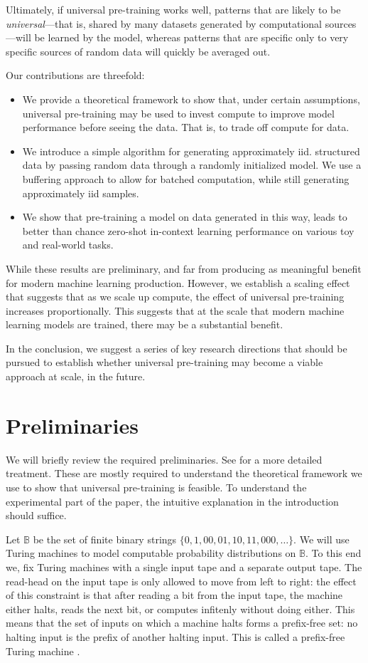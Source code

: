 \documentclass{article} %
\newcommand{\B}{\mathbb B}
\begin{document}
Ultimately, if universal pre-training works well, patterns that are likely to be \emph{universal}---that is, shared by many datasets generated by computational sources---will be learned by the model, whereas patterns that are specific only to very specific sources of random data will quickly be averaged out. 

Our contributions are threefold:
\begin{itemize}
\item We provide a theoretical framework to show that, under certain assumptions, universal pre-training may be used to invest compute to improve model performance before seeing the data. That is, to trade off compute for data. 
\item We introduce a simple algorithm for generating approximately iid. structured data by passing random data through a randomly initialized model. We use a buffering approach to allow for batched computation, while still generating approximately iid samples.
\item We show that pre-training a model on data generated in this way, leads to better than chance zero-shot in-context learning performance on various toy and real-world tasks. 
\end{itemize}

While these results are preliminary, and far from producing as meaningful benefit for modern machine learning production. However, we establish a scaling effect that suggests that as we scale up compute, the effect of universal pre-training increases proportionally. This suggests that at the scale that modern machine learning models are trained, there may be a substantial benefit.

In the conclusion, we suggest a series of key research directions that should be pursued to establish whether universal pre-training may become a viable approach at scale, in the future.

\section{Preliminaries}

We will briefly review the required preliminaries. See \cite{} for a more detailed treatment. These are mostly required to understand the theoretical framework we use to show that universal pre-training is feasible. To understand the experimental part of the paper, the intuitive explanation in the introduction should suffice.

Let $\B$ be the set of finite binary strings $\{0, 1, 00, 01, 10, 11, 000, \ldots\}$. We will use Turing machines \cite{} to model computable probability distributions on $\B$. To this end we, fix Turing machines with a single input tape and a separate output tape. The read-head on the input tape is only allowed to move from left to right: the effect of this constraint is that after reading a bit from the input tape, the machine either halts, reads the next bit, or computes infitenly without doing either. This means that the set of inputs on which a machine halts forms a prefix-free set: no halting input is the prefix of another halting input.  This is called a prefix-free Turing machine \cite{}.
\end{document}
